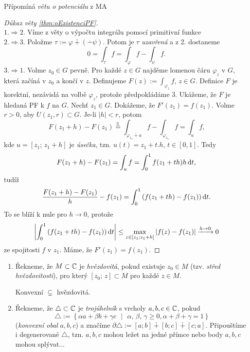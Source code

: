 \begin{note}
Přípomíná \emph{větu o potenciálu} z MA 
\end{note}

\begin{proof}[Důkaz věty \cref{thm:oExistenciPF}]
\mbox{}\\
$1. \Rightarrow 2.$ Víme z věty o výpočtu integrálu pomocí primitivní funkce\\
$2. \Rightarrow 3.$ Položme $\tau:=\varphi \dotplus(\dotminus\psi)$. Potom je $\tau$ \emph{uzavřená} a z 2. dostaneme $$0=\int_\tau f=\int_\varphi f - \int_\psi f\text{.}$$
$3. \Rightarrow 1.$ Volme $z_0\in G$ pevně. Pro každé $z\in G$ najděme lomenou čáru $\varphi_z$ v $G$, která začíná v $z_0$ a končí v $z$. 
Definujeme $F(z):=\int_{\varphi_z} f$, $z\in G$. 
Definice $F$ je korektní, nezávislá na volbě $\varphi_z$, protože předpokládáme 3. Ukážeme, že $F$ je hledaná PF k $f$ na $G$. Nechť $z_1\in G$. Dokážeme, že $F'(z_1)=f(z_1)$. 
Volme $r>0$, aby $U(z_1,r)\subset G$. Je-li $|h|<r$, 
potom $$F(z_1+h)-F(z_1)\stackrel{3.}{=}\int_{\varphi_{z_1}\dotplus u} f-\int_{\varphi_{z_1}}f=\int_u f\text{,}$$
kde $u=\left[z_1;\, z_1+h \right]$ je \emph{úsečka}, tzn. $u(t)=z_1+t.h$, $t\in[0,1]$. 
Tedy $$F(z_1+h)-F(z_1)=\int_u f=\int_0^1 f(z_1+th)h \mathop{}\!\mathrm{d} t\text{,}$$tudíž $$\frac{F(z_1+h)-F(z_1)}{h}-f(z_1)=\int_0^1 \left(f(z_1+th)-f(z_1)\right)\mathop{}\!\mathrm{d} t\text{.}$$ To se blíží k nule pro $h\rightarrow0$, protože 
$$\left| \int_0^1\left(f(z_1+th)-f(z_1)\right)\mathop{}\!\mathrm{d} t\right| \leq \max_{z\in[z_1;z_1+h]}\left|f(z)-f(z_1)\right| \xrightarrow{ h\rightarrow 0}0$$
ze spojitosti $f$ v $z_1$. Máme, že $F'(z_1)=f(z_1)$.
\end{proof}

\begin{notation}
\mbox{}
\begin{enumerate}
    \item 
        Řekneme, že $M\subset\operatorname{\mathbb{C}}  $ je \emph{hvězdovitá}, pokud existuje $z_0\in M$ (tzv. \emph{střed hvězdovitosti}), pro který $[z_0;\,z]\subset M$ pro každé $z\in M$.
        \begin{note*}
            Konvexní $\subsetneq$ hvězdovitá.
        \end{note*}
    \item
        Řekneme, že $\triangle\subset\operatorname{\mathbb{C}}  $ 
        je \emph{trojúhelník} s vrcholy $a,b,c\in\operatorname{\mathbb{C}}  $, 
        pokud $$\triangle:=\left\{ \alpha a+\beta b + \gamma c\text{ }|\text{ }\alpha,\,\beta,\,\gamma\geq 0,\alpha+\beta+\gamma=1 \right\}$$ (\emph{konvexní obal }$a,b,c$) a značíme
        $\partial\triangle:=[a;b]\dotplus[b;c]\dotplus[c;a]$. 
        Připouštíme i degenerované $\triangle$, tzn. $a,b,c$ mohou ležet na jedné přímce nebo body $a,b,c$ mohou splývat...
\end{enumerate}
\end{notation}

